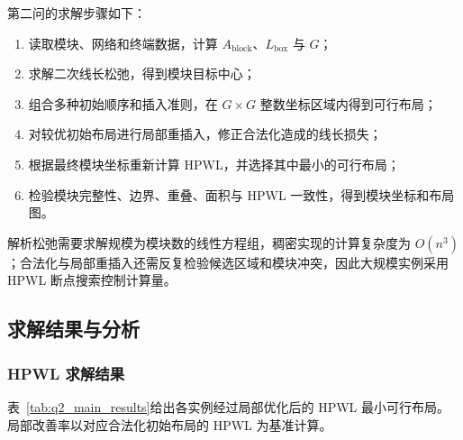 第二问的求解步骤如下：
\begin{enumerate}
  \item 读取模块、网络和终端数据，计算 $A_{\mathrm{block}}$、$L_{\mathrm{box}}$ 与 $G$；
  \item 求解二次线长松弛，得到模块目标中心；
  \item 组合多种初始顺序和插入准则，在 $G\times G$ 整数坐标区域内得到可行布局；
  \item 对较优初始布局进行局部重插入，修正合法化造成的线长损失；
  \item 根据最终模块坐标重新计算 HPWL，并选择其中最小的可行布局；
  \item 检验模块完整性、边界、重叠、面积与 HPWL 一致性，得到模块坐标和布局图。
\end{enumerate}

解析松弛需要求解规模为模块数的线性方程组，稠密实现的计算复杂度为 $O(n^3)$；合法化与局部重插入还需反复检验候选区域和模块冲突，因此大规模实例采用 HPWL 断点搜索控制计算量。

\subsection{求解结果与分析}

\subsubsection{HPWL 求解结果}

表~\ref{tab:q2_main_results}给出各实例经过局部优化后的 HPWL 最小可行布局。局部改善率以对应合法化初始布局的 HPWL 为基准计算。

\begin{table}[H]
  \centering
  \caption{问题二固定轮廓下的 HPWL 优化结果}
  \label{tab:q2_main_results}
  \small
\end{table}

